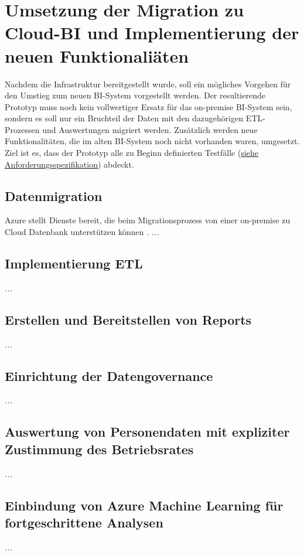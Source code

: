 \section[Umstieg zu Cloud-BI]{Umsetzung der Migration zu Cloud-BI und Implementierung der neuen Funktionaliäten} \label{sec:praktischeUmsetzung:Migration}
Nachdem die Infrastruktur bereitgestellt wurde, soll ein mögliches Vorgehen für den Umstieg zum neuen BI-System vorgestellt werden. Der resultierende Prototyp muss noch kein vollwertiger Ersatz für das on-premise BI-System sein, sondern es soll nur ein Bruchteil der Daten mit den dazugehörigen ETL-Prozessen und Auswertungen migriert werden. Zusätzlich werden neue Funktionalitäten, die im alten BI-System noch nicht vorhanden waren, umgesetzt. Ziel ist es, dass der Prototyp alle zu Beginn definierten Testfälle (\hyperref[sec:anforderungsspezifikation:funktionaleAnforderungen]{siehe Anforderungsspezifikation}) abdeckt.

\subsection{Datenmigration}
Azure stellt Dienste bereit, die beim Migrationsprozess von einer on-premise zu Cloud Datenbank unterstützen können \cite{chilberto_building_2020}. 
\textit{...}

\subsection{Implementierung ETL}
\textit{...}

\subsection{Erstellen und Bereitstellen von Reports}
\textit{...}

\subsection{Einrichtung der Datengovernance}
\textit{...}

\subsection{Auswertung von Personendaten mit expliziter Zustimmung des Betriebsrates}
\textit{...}

\subsection{Einbindung von Azure Machine Learning für fortgeschrittene Analysen}
\textit{...}